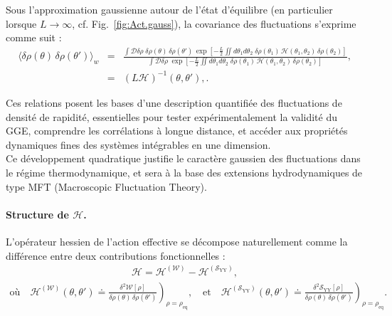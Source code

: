 \smallskip

Sous l’approximation gaussienne autour de l’état d’équilibre (en particulier lorsque \(L \to \infty\), cf. Fig.~\ref{fig:Act.gauss}), la covariance des fluctuations s’exprime comme suit :
\begin{eqnarray}
\langle \delta \rho(\theta) \, \delta \rho(\theta') \rangle_w &=& \frac{
 \displaystyle \int \mathcal{D} \delta \rho \; \delta \rho(\theta) \, \delta \rho(\theta') 
    \, \exp \left[ 
        -\frac{L}{2} 
        \iint  d \theta_1 d \theta_2 \; 
        \delta \rho(\theta_1) \, \mathcal{H}(\theta_1, \theta_2 )  \, \delta \rho(\theta_2) 
    \right]
}{
    \displaystyle \int \mathcal{D} \delta \rho \; 
    \exp \left[ 
        -\frac{L}{2} 
        \iint  d \theta_1 d \theta_2 \; 
        \delta \rho(\theta_1) \, \mathcal{H}(\theta_1, \theta_2 )  \, \delta \rho(\theta_2) 
    \right]
}, \nonumber \\
&=& (L \mathcal{H})^{-1}(\theta, \theta' ), \label{eq:fluctuations}
\label{chap:fluctu:eq:fluctuations}.
\end{eqnarray}

\medskip

Ces relations posent les bases d'une description quantifiée des fluctuations de densité de rapidité, essentielles pour tester expérimentalement la validité du GGE, comprendre les corrélations à longue distance, et accéder aux propriétés dynamiques fines des systèmes intégrables en une dimension.\\

Ce développement quadratique justifie le caractère gaussien des fluctuations dans le régime thermodynamique, et sera à la base des extensions hydrodynamiques de type MFT (Macroscopic Fluctuation Theory).

\paragraph{Structure de \(\mathcal{H}\).}

L’opérateur hessien de l’action effective se décompose naturellement comme la différence entre deux contributions fonctionnelles :
\begin{eqnarray}
	\mathcal{H} = \mathcal{H}^{(\mathcal{W})} - \mathcal{H}^{(\mathcal{S}_{\mathrm{YY}})},
\end{eqnarray}
\begin{eqnarray}
	\mbox{où} \quad \mathcal{H}^{(\mathcal{W})}(\theta,\theta') \doteq \left. \frac{\delta^2 \mathcal{W}[\rho]}{\delta \rho(\theta)\, \delta \rho(\theta')} \right)_{\rho = \rho_{\mathrm{eq}}}, \quad \text{et} \quad \mathcal{H}^{(\mathcal{S}_{\mathrm{YY}})}(\theta,\theta') \doteq \left. \frac{\delta^2 \mathcal{S}_{\mathrm{YY}}[\rho]}{\delta \rho(\theta)\, \delta \rho(\theta')} \right)_{\rho = \rho_{\mathrm{eq}}}.
\end{eqnarray}

